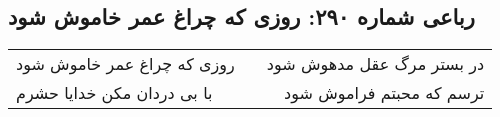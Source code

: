 \begin{center}
\section*{رباعی شماره ۲۹۰: روزی که چراغ عمر خاموش شود}
\label{sec:sh290}
\begin{longtable}{l p{0.5cm} r}
روزی که چراغ عمر خاموش شود
&&
در بستر مرگ عقل مدهوش شود
\\
با بی دردان مکن خدایا حشرم
&&
ترسم که محبتم فراموش شود
\\
\end{longtable}
\end{center}
